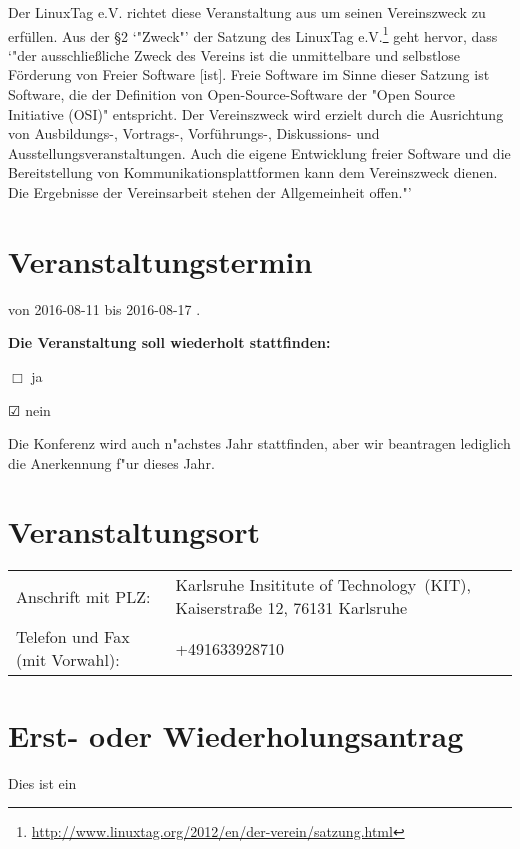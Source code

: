 \documentclass{scrartcl}
\begin{document}
    
      Der LinuxTag e.V. richtet diese Veranstaltung aus um seinen 
      Vereinszweck zu erfüllen.
      Aus der §2 `"Zweck"' der Satzung des LinuxTag e.V.\footnote{\url{http://www.linuxtag.org/2012/en/der-verein/satzung.html}}
      geht hervor, dass
      `"der ausschließliche Zweck des Vereins ist die unmittelbare und selbstlose Förderung von Freier Software [ist].
      Freie Software im Sinne dieser Satzung ist Software, die der Definition von Open-Source-Software der "Open Source Initiative (OSI)" entspricht.
      Der Vereinszweck wird erzielt durch die Ausrichtung von Ausbildungs-, Vortrags-, Vorführungs-, Diskussions- und Ausstellungsveranstaltungen. Auch die eigene Entwicklung freier Software und die Bereitstellung von Kommunikationsplattformen kann dem Vereinszweck dienen. Die Ergebnisse der Vereinsarbeit stehen der Allgemeinheit offen."'



\section{Veranstaltungstermin}

von
\hspace{5em}
%
2016-08-11
%
\hspace{5em}
bis
\hspace{5em}
%
2016-08-17\xspace
.

\textbf{Die Veranstaltung soll wiederholt stattfinden:}

$\Box$
ja

$\CheckedBox$
nein

Die Konferenz wird auch n"achstes Jahr stattfinden,
aber wir beantragen lediglich die Anerkennung f"ur dieses Jahr.

\section{Veranstaltungsort}
\begin{tabu} to  0.95\textwidth { X X[2] }
Anschrift mit PLZ:               &
    Karlsruhe Insititute of Technology~(KIT), Kaiserstraße 12, 76131 Karlsruhe
    \\
Telefon und Fax (mit Vorwahl):   &
    +491633928710\\
\end{tabu}



\section{Erst- oder Wiederholungsantrag}
Dies ist ein
\end{document}

